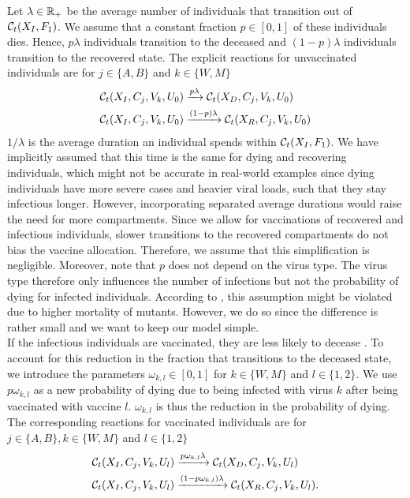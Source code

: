 Let $\lambda \in \mathbb{R}_+$ be the average number of individuals that transition out of $\mathcal{C}_t(X_I, F_1)$. We assume that a constant fraction $p \in [0,1]$ of these individuals dies. Hence, $p\lambda$ individuals transition to the deceased and $(1-p)\lambda$ individuals transition to the recovered state. 
The explicit reactions for unvaccinated individuals are for $j \in \{A, B\}$ and $k \in \{W, M\}$
\begin{align}
    \mathcal{C}_t(X_I, C_j, V_k, U_0) &\xrightarrow{p \lambda} \mathcal{C}_t(X_D,C_j, V_k, U_0)  \\
    \mathcal{C}_t(X_I, C_j, V_k, U_0) &\xrightarrow{(1-p) \lambda} \mathcal{C}_t(X_R,C_j, V_k, U_0) \notag
\end{align}
$1/\lambda$ is the average duration an individual spends within $\mathcal{C}_t(X_I, F_1)$. We have implicitly assumed that this time is the same for dying and recovering individuals, which might not be accurate in real-world examples since dying individuals have more severe cases and heavier viral loads, such that they stay infectious longer. However, incorporating separated average durations would raise the need for more compartments. Since we allow for vaccinations of recovered and infectious individuals, slower transitions to the recovered compartments do not bias the vaccine allocation. Therefore, we assume that this simplification is negligible. Moreover, note that $p$ does not depend on the virus type. The virus type therefore only influences the number of infections but not the probability of dying for infected individuals. According to \cite{Davies.2021}, this assumption might be violated due to higher mortality of mutants. However, we do so since the difference is rather small and we want to keep our model simple. \\


If the infectious individuals are vaccinated, they are less likely to decease \citep{Tenforde.2021, Voysey.2021}. To account for this reduction in the fraction that transitions to the deceased state, we introduce the parameters $\omega_{k,l} \in [0,1]$ for $k \in \{W, M\}$ and $l \in \{1,2\}$. We use $p \omega_{k,l}$ as a new probability of dying due to being infected with virus $k$ after being vaccinated with vaccine $l$. $\omega_{k,l}$ is thus the reduction in the probability of dying. The corresponding reactions for vaccinated individuals are for $j \in \{A, B\}, k \in \{W, M\}$ and $l \in \{1,2\}$
\begin{align}
    \mathcal{C}_t(X_I, C_j, V_k, U_l) &\xrightarrow{p \omega_{k,l} \lambda} \mathcal{C}_t(X_D,C_j, V_k, U_l) \\
    \mathcal{C}_t(X_I, C_j, V_k, U_l) &\xrightarrow{(1-p \omega_{k,l}) \lambda} \mathcal{C}_t(X_R,C_j, V_k, U_l) \notag.
\end{align}

